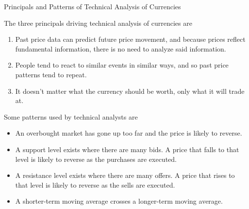 \documentclass[../custom,grid]{flashcards}
\newcommand{\studyArea}{Risk Management}
\begin{document}
\begin{flashcard}[\studyArea]{Principals and Patterns of Technical Analysis of Currencies}
    \begin{flushleft}
        The three principals driving technical analysis of currencies are
        \begin{enumerate}
            \item Past price data can predict future price movement, and because prices reflect fundamental information, there is no need to analyze said information.
            \item People tend to react to similar events in similar ways, and so past price patterns tend to repeat.
            \item It doesn't matter what the currency should be worth, only what it will trade at.
        \end{enumerate}
        Some patterns used by technical analysts are
        \begin{itemize}
            \item An overbought market has gone up too far and the price is likely to reverse.
            \item A support level exists where there are many bids. A price that falls to that level is likely to reverse as the purchases are executed.
            \item A resistance level exists where there are many offers. A price that rises to that level is likely to reverse as the sells are executed.
            \item A shorter-term moving average crosses a longer-term moving average.
        \end{itemize}
    \end{flushleft}
\end{flashcard}
\end{document}
